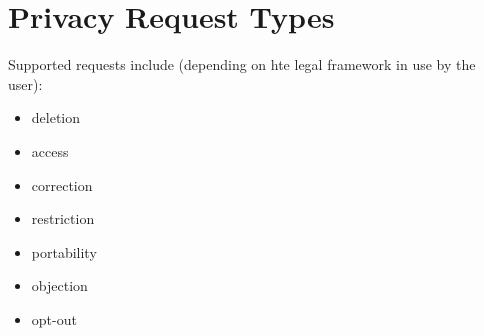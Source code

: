 
\chapter{Privacy Request Types}

Supported requests include (depending on hte legal framework in use by the user):

\begin{itemize}
	\item deletion
	\item access
	\item correction
	\item restriction
	\item portability
	\item objection
	\item opt-out
\end{itemize}
\sentinelchapterend
